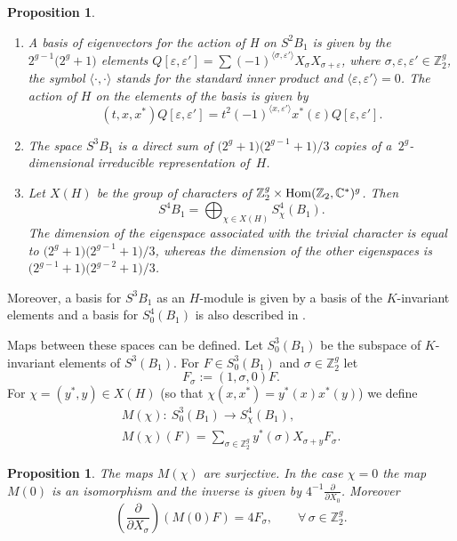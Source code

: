 \documentclass[pdftex]{sigma}
\numberwithin{equation}{section}
\newtheorem{Proposition}[Theorem]{Proposition}
{ \theoremstyle{definition}
\newtheorem{Remark}[Theorem]{Remark} }
\newcommand{\ep}{\varepsilon}
\newcommand{\CC}{{\mathbb{C}}}
\newcommand{\ZZ}{{\mathbb{Z}}}
\def\ZZ{{\mathbb Z}}
\def\s{\sigma}
\begin{document}
\begin{Proposition}\label{pr.vG1}\quad
\begin{enumerate}\itemsep=0pt
\item[$(i)$] A basis of eigenvectors for the action of H on $S^2B_1$ is given by the $2^{g-1}\big( 2^{g}+1\big)$ elements $Q[\ep, \ep']=\sum(-1)^{\langle \s,\ep'\rangle}X_{\s}X_{\s+\ep}$, where $\s, \ep, \ep'\in\ZZ_2^g$, the symbol $\langle \cdot,\cdot\rangle$ stands for the standard inner product and $\langle \ep,\ep'\rangle=0$. The action of $H$ on the elements of the basis is given by
\[
(t, x, x^*)Q[\ep, \ep']=t^2(-1)^{\langle x,\ep'\rangle}x^*(\ep)Q[\ep, \ep'].
\]
\item[$(ii)$] The space $S^3B_1$ is a direct sum of $\big(2^g+1\big)\big(2^{g-1}+1\big)/3$ copies of a~$2^g$-dimensional irreducible representation of~$H$.
\item[$(iii)$]Let $X(H)$ be the group of characters of $\ZZ_{2}^g\times {\rm Hom}(\ZZ_{2}, \CC^{*})^g$. Then
\[
S^4B_1= \bigoplus_{\chi\in X(H)} S^4_{\chi}(B_1).
\]
The dimension of the eigenspace associated with the trivial character is equal to $\big(2^g+1\big)\big(2^{g-1}+1\big)/3$, whereas the dimension of the other eigenspaces is $\big(2^{g-1}+1\big)\big(2^{g-2}+1\big)/3$.
\end{enumerate}
\end{Proposition}

Moreover, a basis for $S^3B_1$ as an $H$-module is given by a basis of the $K$-invariant elements and a basis for $S^4_{0}(B_1)$ is also described in \cite{vG}.

Maps between these spaces can be defined. Let $S^3_{0}(B_1)$ be the subspace of $K$-invariant elements of $S^3(B_1)$.
 For $F\in S^3_{0}(B_1)$ and $ \s\in \ZZ_{2}^g$ let
\[
F_{\s}:=( 1, \s, 0)F.
\]
For $\chi=(y^*, y)\in X(H)$ (so that $\chi(x, x^*)=y^*(x)x^*(y)$) we define
\begin{gather*}
M(\chi)\colon \ S^3_{0}(B_1)\to S^4_{\chi}(B_1),\\
M(\chi)(F)= \sum_{\s\in \ZZ_{2}^g} y^*(\s)X_{\s+y}F_{\s}.
\end{gather*}

 \begin{Proposition} \label{pr.vG2}The maps $M(\chi)$ are surjective. In the case $\chi=0$ the map $M(0)$ is an isomorphism and the inverse is given by $ 4^{-1}\frac{\partial}{\partial X_0}$. Moreover
\[
\left(\frac{\partial}{\partial X_{\s}}\right)(M(0)F)=4F_{\s},\qquad \forall\, \s\in \ZZ_{2}^g.
\]
\end{Proposition}
\end{document}
